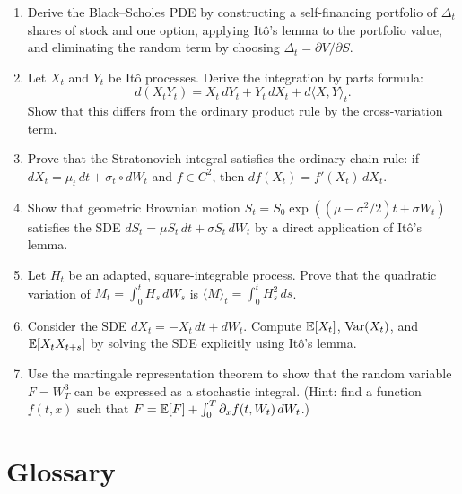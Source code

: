 \begin{enumerate}
    \item [I] Derive the Black--Scholes PDE by constructing a self-financing portfolio of \(\Delta_t\) shares of stock and one option, applying It\^{o}'s lemma to the portfolio value, and eliminating the random term by choosing \(\Delta_t = \partial V/\partial S\).
    \item [I] Let \(X_t\) and \(Y_t\) be It\^{o} processes. Derive the integration by parts formula:
    \[
    d(X_t Y_t) = X_t\,dY_t + Y_t\,dX_t + d\langle X,Y\rangle_t.
    \]
    Show that this differs from the ordinary product rule by the cross-variation term.
    \item [I] Prove that the Stratonovich integral satisfies the ordinary chain rule: if \(dX_t = \mu_t\,dt + \sigma_t \circ dW_t\) and \(f \in C^2\), then \(df(X_t) = f'(X_t)\,dX_t\).
    \item [B] Show that geometric Brownian motion \(S_t = S_0 \exp((\mu - \sigma^2/2)t + \sigma W_t)\) satisfies the SDE \(dS_t = \mu S_t\,dt + \sigma S_t\,dW_t\) by a direct application of It\^{o}'s lemma.
    \item [B] Let \(H_t\) be an adapted, square-integrable process. Prove that the quadratic variation of \(M_t = \int_0^t H_s\,dW_s\) is \(\langle M\rangle_t = \int_0^t H_s^2\,ds\).
    \item [B] Consider the SDE \(dX_t = -X_t\,dt + dW_t\). Compute \(\mathbb{E}[X_t]\), \(\operatorname{Var}(X_t)\), and \(\mathbb{E}[X_t X_{t+s}]\) by solving the SDE explicitly using It\^{o}'s lemma.
    \item [A] Use the martingale representation theorem to show that the random variable \(F = W_T^3\) can be expressed as a stochastic integral. (Hint: find a function \(f(t,x)\) such that \(F = \mathbb{E}[F] + \int_0^T \partial_x f(t,W_t)\,dW_t\).)
\end{enumerate}

\section*{Glossary}

